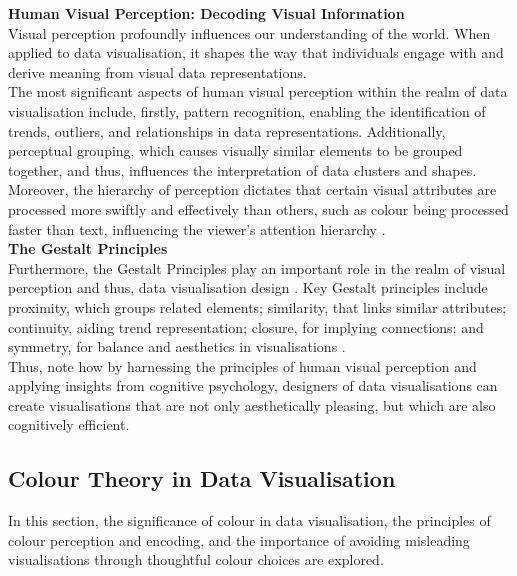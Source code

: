 \documentclass{article}\usepackage[]{graphicx}\usepackage[]{xcolor}
\numberwithin{equation}{section}
\begin{document}
\noindent \textbf{Human Visual Perception: Decoding Visual Information}\\
Visual perception profoundly influences our understanding of the world. When applied to data visualisation, it shapes the way that individuals engage with and derive meaning from visual data representations.\\

\noindent 
The most significant aspects of human visual perception within the realm of data visualisation include, firstly, pattern recognition, enabling the identification of trends, outliers, and relationships in data representations. Additionally, perceptual grouping, which causes visually similar elements to be grouped together, and thus, influences the interpretation of data clusters and shapes. Moreover, the hierarchy of perception dictates that certain visual attributes are processed more swiftly and effectively than others, such as colour being processed faster than text, influencing the viewer's attention hierarchy \cite{dastani2002role}.\\

\noindent \textbf{The Gestalt Principles }\\
Furthermore, the Gestalt Principles play an important role in the realm of visual perception and thus, data visualisation design \cite{rosli2015gestalt}. Key Gestalt principles include proximity, which groups related elements; similarity, that links similar attributes; continuity, aiding trend representation; closure, for implying connections; and symmetry, for balance and aesthetics in visualisations \cite{todorovic2008gestalt}. \\

\noindent Thus, note how by harnessing the principles of human visual perception and applying insights from cognitive psychology, designers of data visualisations can create visualisations that are not only aesthetically pleasing, but which are also cognitively efficient.	

\subsection{Colour Theory in Data Visualisation}
In this section, the significance of colour in data visualisation, the principles of colour perception and encoding, and the importance of avoiding misleading visualisations through thoughtful colour choices are explored.\\
\end{document}
